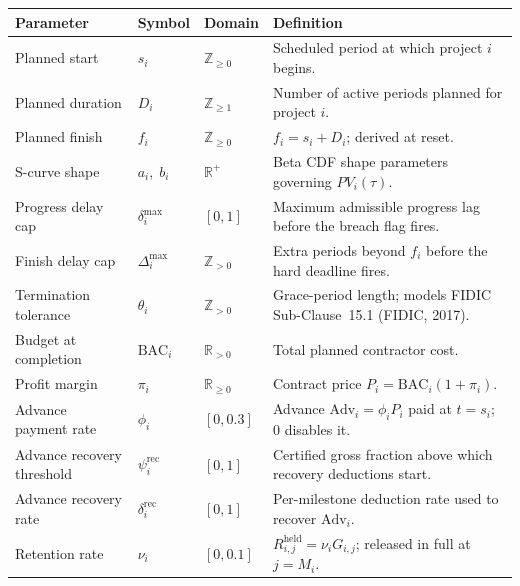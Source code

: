 \documentclass[10pt,border=6pt]{standalone}
\newcommand{\tabfont}{\fontsize{8.5}{10.5}\selectfont}
\begin{document}
\begin{minipage}{170mm}   %
\tabfont
\setlength{\tabcolsep}{4pt}
\renewcommand{\arraystretch}{1.15}
\begin{tabularx}{\linewidth}{l l l >{\raggedright\arraybackslash}X}
\toprule
\textbf{Parameter} & \textbf{Symbol} & \textbf{Domain} & \textbf{Definition} \\
\midrule
Planned start               & $s_i$                      & $\mathbb{Z}_{\geq 0}$ & Scheduled period at which project $i$ begins. \\
Planned duration            & $D_i$                      & $\mathbb{Z}_{\geq 1}$ & Number of active periods planned for project $i$. \\
Planned finish              & $f_i$                      & $\mathbb{Z}_{\geq 0}$ & $f_i = s_i + D_i$; derived at reset. \\
S-curve shape               & $a_i,\; b_i$               & $\mathbb{R}^+$        & Beta CDF shape parameters governing $PV_i(\tau)$. \\
Progress delay cap          & $\delta^{\max}_i$          & $[0,1]$               & Maximum admissible progress lag before the breach flag fires. \\
Finish delay cap            & $\Delta^{\max}_i$          & $\mathbb{Z}_{>0}$     & Extra periods beyond $f_i$ before the hard deadline fires. \\
Termination tolerance       & $\theta_i$                 & $\mathbb{Z}_{>0}$     & Grace-period length; models FIDIC Sub-Clause~15.1 (FIDIC, 2017). \\
Budget at completion        & $\mathrm{BAC}_i$           & $\mathbb{R}_{>0}$     & Total planned contractor cost. \\
Profit margin               & $\pi_i$                    & $\mathbb{R}_{\geq 0}$ & Contract price $P_i = \mathrm{BAC}_i(1+\pi_i)$. \\
Advance payment rate        & $\phi_i$                   & $[0,0.3]$             & Advance $\mathrm{Adv}_i = \phi_i P_i$ paid at $t = s_i$; $0$ disables it. \\
Advance recovery threshold  & $\psi^{\mathrm{rec}}_i$    & $[0,1]$               & Certified gross fraction above which recovery deductions start. \\
Advance recovery rate       & $\delta^{\mathrm{rec}}_i$  & $[0,1]$               & Per-milestone deduction rate used to recover $\mathrm{Adv}_i$. \\
Retention rate              & $\nu_i$                    & $[0,0.1]$             & $R^{\mathrm{held}}_{i,j} = \nu_i G_{i,j}$; released in full at $j = M_i$. \\

\end{tabularx}
\end{minipage}
\end{document}
